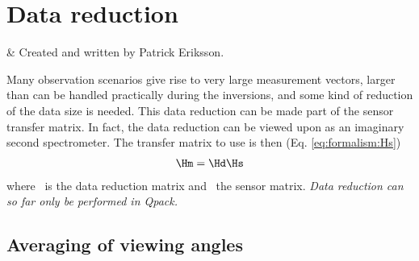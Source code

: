 %
%
\chapter{Data reduction}
 \label{sec:red}


%
%
 & Created and written by Patrick Eriksson.\\
\stophistory


%
%
%



%
%
Many observation scenarios give rise to very large measurement
vectors, larger than can be handled practically during the inversions,
and some kind of reduction of the data size is needed. This data
reduction can be made part of the sensor transfer matrix. In fact, the
data reduction can be viewed upon as an imaginary second spectrometer.
The transfer matrix to use is then (Eq. \ref{eq:formalism:Hs})
\begin{eqnarray}
  \Hm = \Hd \Hs  \nonumber
\end{eqnarray}
where \Hd\ is the data reduction matrix and \Hs\ the sensor matrix.
{\it Data reduction can so far only be performed in Qpack.}


\section{Averaging of viewing angles}
 \label{sec:red:view}
 
